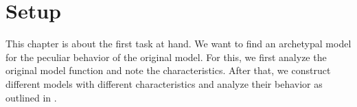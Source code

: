 \chapter{Setup}
\label{chap:setup}

This chapter is about the first task at hand.
We want to find an archetypal model for the peculiar behavior of the original model.
For this, we first analyze the original model function and note the characteristics.
After that, we construct different models with different characteristics and analyze their behavior as outlined in .






